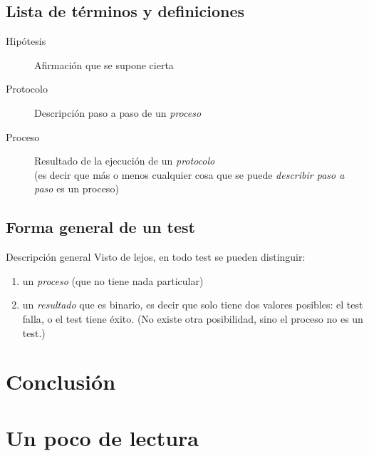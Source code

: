\subsection{Lista de términos y definiciones}

  \begin{frame}{\insertsubsection}
    \begin{description}
      \item[Hipótesis] Afirmación que se supone cierta
      \item[Protocolo] Descripción paso a paso de un \emph{proceso}
      \item[Proceso] Resultado de la ejecución de un \emph{protocolo}\\
           (es decir que más o menos cualquier cosa que se puede \emph{describir paso a paso} es un proceso)
    \end{description}
  \end{frame}

\subsection{Forma general de un test}

  \begin{frame}{\insertsubsection}
    \begin{alertblock}{Descripción general}
      Visto de lejos, en todo test se pueden distinguir:
      \begin{enumerate}
        \item un \emph{proceso} (que no tiene nada particular)
        \item un \emph{resultado} que es \alert{binario}, es decir que solo tiene dos valores posibles: el test \alert{falla}, o el test \alert{tiene éxito}. (No existe otra posibilidad, sino el proceso no es un test.)
      \end{enumerate}
    \end{alertblock}
  \end{frame}

\section*{Conclusión}

  \begin{frame}{\insertsection}
  \end{frame}

\appendix

\section{Un poco de lectura}

